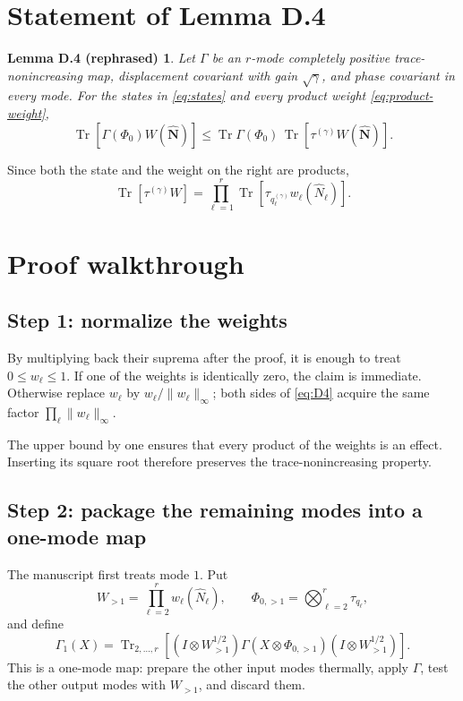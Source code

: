 \documentclass[11pt]{article}
\newcommand{\Tr}{\operatorname{Tr}}
\newtheorem*{lemmaD}{Lemma D.4 (rephrased)}
\begin{document}
\section{Statement of Lemma D.4}

\begin{lemmaD}
Let $\Gamma$ be an $r$-mode completely positive trace-nonincreasing map,
displacement covariant with gain $\sqrt\gamma$, and phase covariant in every
mode.  For the states in \eqref{eq:states} and every product weight
\eqref{eq:product-weight},
\begin{equation}\label{eq:D4}
  \Tr[\Gamma(\Phi_0)W(\widehat{\mathbf N})]
  \leq
  \Tr\Gamma(\Phi_0)\,
  \Tr[\tau^{(\gamma)}W(\widehat{\mathbf N})].
\end{equation}
\end{lemmaD}

Since both the state and the weight on the right are products,
\begin{equation}\label{eq:right-factor}
  \Tr[\tau^{(\gamma)}W]
  =\prod_{\ell=1}^r
    \Tr[\tau_{q_\ell^{(\gamma)}}w_\ell(\widehat N_\ell)].
\end{equation}

\section{Proof walkthrough}

\subsection*{Step 1: normalize the weights}

By multiplying back their suprema after the proof, it is enough to treat
$0\leq w_\ell\leq1$.  If one of the weights is identically zero, the claim
is immediate.  Otherwise replace $w_\ell$ by
$w_\ell/\lVert w_\ell\rVert_\infty$; both sides of \eqref{eq:D4} acquire the
same factor $\prod_\ell\lVert w_\ell\rVert_\infty$.

The upper bound by one ensures that every product of the weights is an
effect.  Inserting its square root therefore preserves the
trace-nonincreasing property.

\subsection*{Step 2: package the remaining modes into a one-mode map}

The manuscript first treats mode $1$.  Put
\[
  W_{>1}=\prod_{\ell=2}^r w_\ell(\widehat N_\ell),
  \qquad
  \Phi_{0,>1}=\bigotimes_{\ell=2}^r\tau_{q_\ell},
\]
and define
\begin{equation}\label{eq:induced-map}
  \Gamma_1(X)
  =\Tr_{2,\ldots,r}\!\left[
    (I\otimes W_{>1}^{1/2})
    \Gamma(X\otimes\Phi_{0,>1})
    (I\otimes W_{>1}^{1/2})
  \right].
\end{equation}
This is a one-mode map: prepare the other input modes thermally, apply
$\Gamma$, test the other output modes with $W_{>1}$, and discard them.
\end{document}
